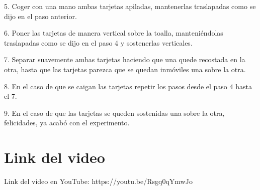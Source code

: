 \documentclass{article}
\begin{document}
 5.	Coger con una mano ambas tarjetas apiladas, mantenerlas traslapadas como se dijo en el paso anterior.\newline \newline

 6.	Poner las tarjetas de manera vertical sobre la toalla, manteniéndolas traslapadas como se dijo en el paso 4 y sostenerlas verticales.  \newline \newline

 7.	Separar suavemente ambas tarjetas haciendo que una quede recostada en la otra, hasta que las tarjetas parezca que se quedan inmóviles una sobre la otra. \newline \newline

 8.	En el caso de que se caigan las tarjetas repetir los pasos desde el paso 4 hasta el 7.\newline \newline

 9.	En el caso de que las tarjetas se queden sostenidas una sobre la otra, felicidades, ya acabó con el experimento. \newline \newline

\newpage

\section{Link del video} \label{Link del video}

Link del video en YouTube: https://youtu.be/Rsgq0qYmwJo 
 \newpage
 
\end{document}
